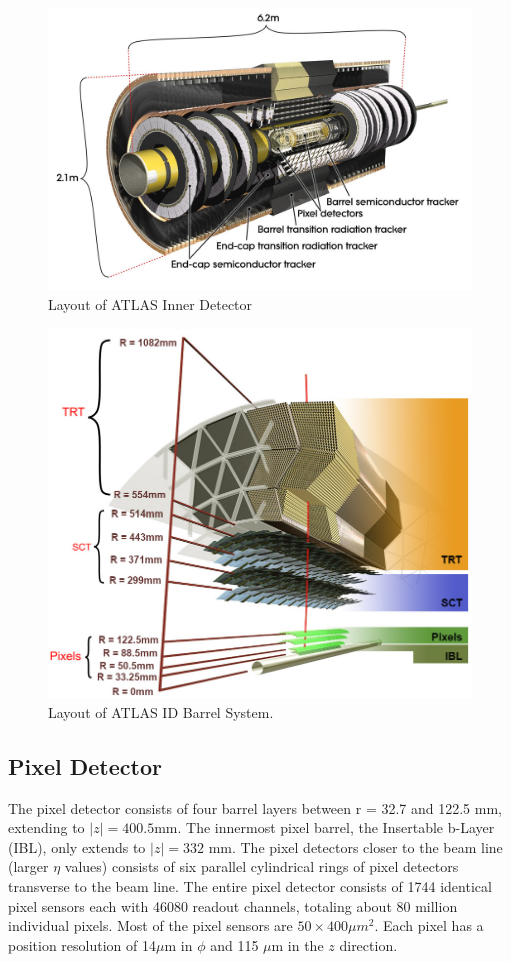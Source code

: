 \begin{figure}[h!]
  \centering
  \includegraphics[width=\hsize]{figures/Detector/tracker_layout.jpg}
  \caption{Layout of ATLAS Inner Detector} 
  \label{fig:ID}
\end{figure}
\FloatBarrier


\begin{figure}[h!]
  \centering
  \includegraphics[width=\hsize]{figures/Detector/tracker_barrel.png}
  \caption{Layout of ATLAS ID Barrel System.} 
  \label{fig:barrelID}
\end{figure}
\FloatBarrier


\subsection{Pixel Detector}
The pixel detector consists of four barrel layers between r = 32.7 and 122.5 mm, extending to $|z|=400.5 $mm. The innermost pixel barrel, the Insertable b-Layer (IBL), only extends to $|z|=332$ mm. The pixel detectors closer to the beam line (larger $\eta$ values) consists of six parallel cylindrical rings of pixel detectors transverse to the beam line. The entire pixel detector consists of 1744 identical pixel sensors each with 46080 readout channels, totaling about 80 million individual pixels. Most of the pixel sensors are $50\times400\mu m^{2}$.  Each pixel has a position resolution of 14$\mu$m in $\phi$ and 115 $\mu$m in the $z$ direction.
